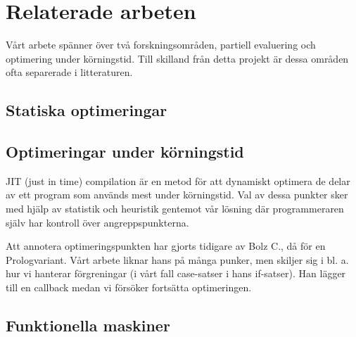 \documentclass[Rapport]{subfiles}
\begin{document}
\section{Relaterade arbeten}
Vårt arbete spänner över två forskningsområden, partiell evaluering
och optimering under körningstid. Till skilland från detta projekt 
är dessa områden ofta separerade i litteraturen.


\subsection{Statiska optimeringar}



\subsection{Optimeringar under körningstid}

JIT (just in time) compilation är en metod för att dynamiskt optimera
de delar av ett program som används mest under körningstid. Val av
dessa punkter sker med hjälp av statistik och heuristik gentemot vår
lösning där programmeraren själv har kontroll över angreppspunkterna. 

Att annotera optimeringspunkten har gjorts tidigare av Bolz C., då
för en Prologvariant.\cite{bolz-automatic} Vårt arbete liknar hans
på många punker, men skiljer sig i bl. a. hur vi hanterar förgreningar
(i vårt fall case-satser i hans if-satser). Han lägger till en callback
medan vi försöker fortsätta optimeringen.

\subsection{Funktionella maskiner}




\end{document}
